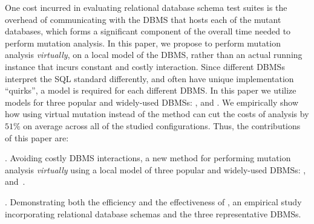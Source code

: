 

One cost incurred in evaluating relational database schema test suites is the overhead of communicating with the DBMS that hosts each of the mutant databases, which forms a significant component of the overall time needed to perform mutation analysis. In this paper, we propose to perform mutation analysis {\it virtually}, on a local model of the DBMS, rather than an actual running instance that incurs constant and costly interaction. Since different DBMSs interpret the SQL standard differently, and often have unique implementation ``quirks'', a model is required for each different DBMS. In this paper we utilize models for three popular and widely-used DBMSs: \HyperSQL, \Postgres and \SQLite. We empirically show how using virtual mutation instead of the \Original method can cut the costs of analysis by $51\%$ on average across all of the studied configurations. Thus, the contributions of this paper are:

. Avoiding costly DBMS interactions, a new method for performing mutation analysis {\it virtually} using a
local model of three popular and widely-used DBMSs: \HyperSQL, \mbox{\Postgres and \SQLite.}

\vspace{1mm} . Demonstrating both the efficiency and the effectiveness of \vma, an empirical study
incorporating \numschemas relational database schemas and the three representative DBMSs.


